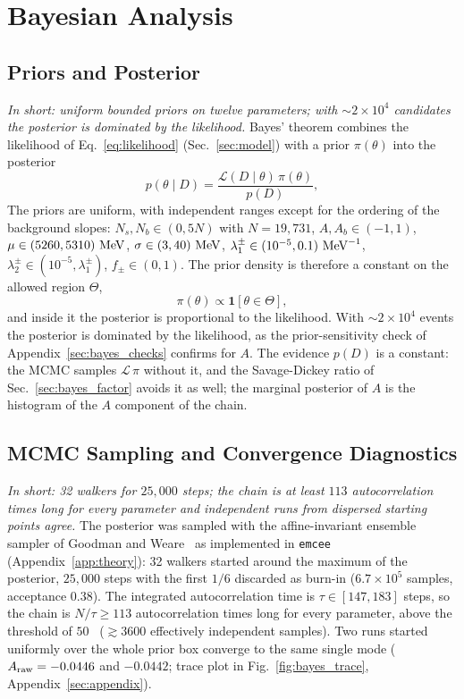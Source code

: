 \section{Bayesian Analysis}
\label{sec:bayesian}

\subsection{Priors and Posterior}
\label{sec:bayes_prior}
\emph{In short: uniform bounded priors on twelve parameters; with $\sim2\times10^4$ candidates the posterior is dominated by the likelihood.}
Bayes' theorem combines the likelihood of Eq.~\eqref{eq:likelihood} (Sec.~\ref{sec:model}) with a prior $\pi(\theta)$ into the posterior
\begin{equation}
p(\theta\mid D)=\frac{\mathcal{L}(D\mid\theta)\,\pi(\theta)}{p(D)},
\label{eq:bayes}
\end{equation}
The priors are uniform, with independent ranges except for the ordering of the background slopes: $N_s,N_b\in(0,5N)$ with $N=19{,}731$, $A,A_b\in(-1,1)$, $\mu\in(5260,5310)\,\,\text{Me\hspace{-.08em}V}$, $\sigma\in(3,40)\,\,\text{Me\hspace{-.08em}V}$, $\lambda_1^{\pm}\in(10^{-5},0.1)\,\,\text{Me\hspace{-.08em}V}^{-1}$, $\lambda_2^{\pm}\in(10^{-5},\lambda_1^{\pm})$, $f_{\pm}\in(0,1)$. The prior density is therefore a constant on the allowed region $\Theta$,
\begin{equation}
\pi(\theta)\propto\mathbf{1}\left[\theta\in\Theta\right],
\label{eq:prior}
\end{equation}
and inside it the posterior is proportional to the likelihood. With $\sim$$2\times10^4$ events the posterior is dominated by the likelihood, as the prior-sensitivity check of Appendix~\ref{sec:bayes_checks} confirms for $A$. The evidence $p(D)$ is a constant: the MCMC samples $\mathcal{L}\,\pi$ without it, and the Savage-Dickey ratio of Sec.~\ref{sec:bayes_factor} avoids it as well; the marginal posterior of $A$ is the histogram of the $A$ component of the chain.

\subsection{MCMC Sampling and Convergence Diagnostics}
\label{sec:bayes_mcmc}
\emph{In short: 32 walkers for $25{,}000$ steps; the chain is at least $113$ autocorrelation times long for every parameter and independent runs from dispersed starting points agree.}
The posterior was sampled with the affine-invariant ensemble sampler of Goodman and Weare~\cite{goodman_weare} as implemented in \texttt{emcee}~\cite{emcee} (Appendix~\ref{app:theory}): 32 walkers started around the maximum of the posterior, $25{,}000$ steps with the first $1/6$ discarded as burn-in ($6.7\times10^5$ samples, acceptance $0.38$). The integrated autocorrelation time is $\tau\in[147,183]$ steps, so the chain is $N/\tau\geq113$ autocorrelation times long for every parameter, above the threshold of $50$~\cite{emcee} ($\gtrsim3600$ effectively independent samples). Two runs started uniformly over the whole prior box converge to the same single mode ($A_{\mathrm{raw}}=-0.0446$ and $-0.0442$; trace plot in Fig.~\ref{fig:bayes_trace}, Appendix~\ref{sec:appendix}).

